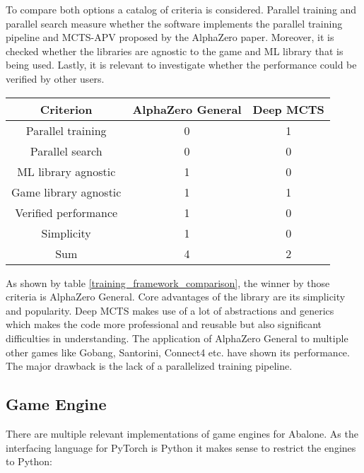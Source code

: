 To compare both options a catalog of criteria is considered. Parallel training and parallel search measure whether the software implements the parallel training pipeline and MCTS-APV proposed by the AlphaZero paper. Moreover, it is checked whether the libraries are agnostic to the game and ML library that is being used. Lastly, it is relevant to investigate whether the performance could be verified by other users.

\begin{table*}
    \begin{center}
        \begin{tabular}{ c|c|c }
            Criterion             & AlphaZero General & Deep MCTS \\
            \hline
            \hline
            Parallel training     & 0                 & 1         \\
            Parallel search       & 0                 & 0         \\
            ML library agnostic   & 1                 & 0         \\
            Game library agnostic & 1                 & 1         \\
            Verified performance  & 1                 & 0         \\
            Simplicity            & 1                 & 0         \\
            \hline
            \hline
            Sum                   & 4                 & 2         \\
        \end{tabular}
    \end{center}
    \caption{A comparison of existing AlphaZero frameworks}\label{training_framework_comparison}
\end{table*}

As shown by table \ref{training_framework_comparison}, the winner by those criteria is AlphaZero General. Core advantages of the library are its simplicity and popularity. Deep MCTS makes use of a lot of abstractions and generics which makes the code more professional and reusable but also significant difficulties in understanding. The application of AlphaZero General to multiple other games like Gobang, Santorini, Connect4 etc. have shown its performance. The major drawback is the lack of a parallelized training pipeline.

\subsection{Game Engine}
There are multiple relevant implementations of game engines for Abalone. As the interfacing language for PyTorch is Python it makes sense to restrict the engines to Python:


